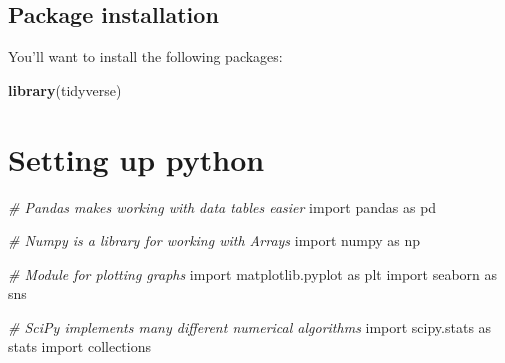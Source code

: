 \documentclass[]{book}
\newenvironment{Shaded}{\begin{snugshade}}{\end{snugshade}}
\newcommand{\CommentTok}[1]{\textcolor[rgb]{0.56,0.35,0.01}{\textit{#1}}}
\newcommand{\KeywordTok}[1]{\textcolor[rgb]{0.13,0.29,0.53}{\textbf{#1}}}
\newcommand{\NormalTok}[1]{#1}
\begin{document}
\hypertarget{package-installation}{%
\section{Package installation}\label{package-installation}}

You'll want to install the following packages:

\begin{Shaded}
\begin{Highlighting}[]
\KeywordTok{library}\NormalTok{(tidyverse)}
\end{Highlighting}
\end{Shaded}

\hypertarget{appendixB}{%
\chapter{Setting up python}\label{appendixB}}

\begin{Shaded}
\begin{Highlighting}[]
\CommentTok{# Pandas makes working with data tables easier}
\NormalTok{import pandas as pd}

\CommentTok{# Numpy is a library for working with Arrays}
\NormalTok{import numpy as np}

\CommentTok{# Module for plotting graphs}
\NormalTok{import matplotlib.pyplot as plt}
\NormalTok{import seaborn as sns}

\CommentTok{# SciPy implements many different numerical algorithms}
\NormalTok{import scipy.stats as stats}
\NormalTok{import collections}
\end{Highlighting}
\end{Shaded}


\end{document}
